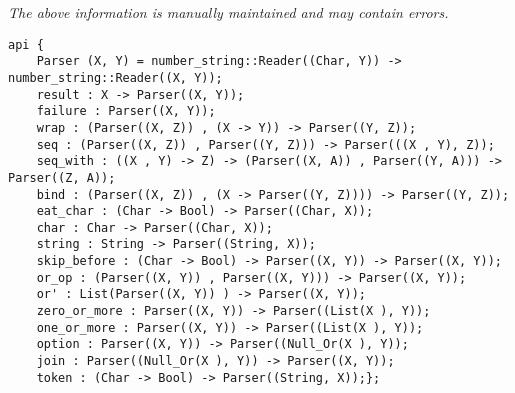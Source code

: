 \label{api:Parser\_Combinator}

{\tiny \it The above information is manually maintained and may contain errors.}
\begin{verbatim}
api {
    Parser (X, Y) = number_string::Reader((Char, Y)) -> number_string::Reader((X, Y));
    result : X -> Parser((X, Y));
    failure : Parser((X, Y));
    wrap : (Parser((X, Z)) , (X -> Y)) -> Parser((Y, Z));
    seq : (Parser((X, Z)) , Parser((Y, Z))) -> Parser(((X , Y), Z));
    seq_with : ((X , Y) -> Z) -> (Parser((X, A)) , Parser((Y, A))) -> Parser((Z, A));
    bind : (Parser((X, Z)) , (X -> Parser((Y, Z)))) -> Parser((Y, Z));
    eat_char : (Char -> Bool) -> Parser((Char, X));
    char : Char -> Parser((Char, X));
    string : String -> Parser((String, X));
    skip_before : (Char -> Bool) -> Parser((X, Y)) -> Parser((X, Y));
    or_op : (Parser((X, Y)) , Parser((X, Y))) -> Parser((X, Y));
    or' : List(Parser((X, Y)) ) -> Parser((X, Y));
    zero_or_more : Parser((X, Y)) -> Parser((List(X ), Y));
    one_or_more : Parser((X, Y)) -> Parser((List(X ), Y));
    option : Parser((X, Y)) -> Parser((Null_Or(X ), Y));
    join : Parser((Null_Or(X ), Y)) -> Parser((X, Y));
    token : (Char -> Bool) -> Parser((String, X));};
\end{verbatim}
